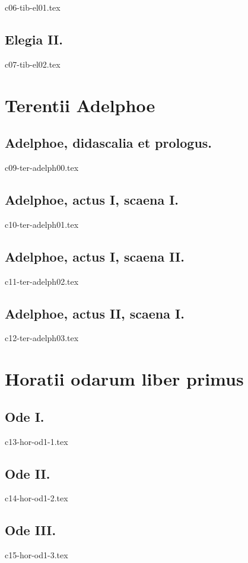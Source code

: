 \documentclass[a4paper,12pt,twoside]{book}
\begin{document}
{c06-tib-el01.tex}

\chapter{Elegia II.}


{c07-tib-el02.tex}







\part{Terentii Adelphoe}

\chapter{Adelphoe, didascalia et prologus.}


{c09-ter-adelph00.tex}

\chapter{Adelphoe, actus I, scaena I.}


{c10-ter-adelph01.tex}

\chapter{Adelphoe, actus I, scaena II.}


{c11-ter-adelph02.tex}

\chapter{Adelphoe, actus II, scaena I.}


{c12-ter-adelph03.tex}


\part{Horatii odarum liber primus}

\chapter{Ode I.}


{c13-hor-od1-1.tex}

\chapter{Ode II.}


{c14-hor-od1-2.tex}

\chapter{Ode III.}


{c15-hor-od1-3.tex}



\tableofcontents
\end{document}
